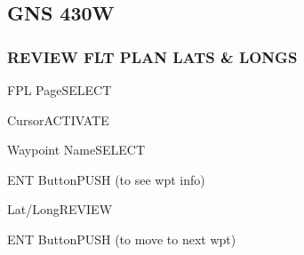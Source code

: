 \begin{multicols}{2}
\columnbreak %
\subsection*{GNS 430W}
\subsubsection*{REVIEW FLT PLAN LATS \& LONGS}
\begin{enumerate*}
\item FPL Page\dotfill SELECT
\item Cursor\dotfill ACTIVATE
\item Waypoint Name\dotfill SELECT
\item ENT Button\dotfill PUSH (to see wpt info)
\item Lat/Long\dotfill REVIEW
\item ENT Button\dotfill PUSH (to move to next wpt)
\end{enumerate*}

\end{multicols}

\cleardoublepage
\ohead{\leftmark} %
\chead{} %
